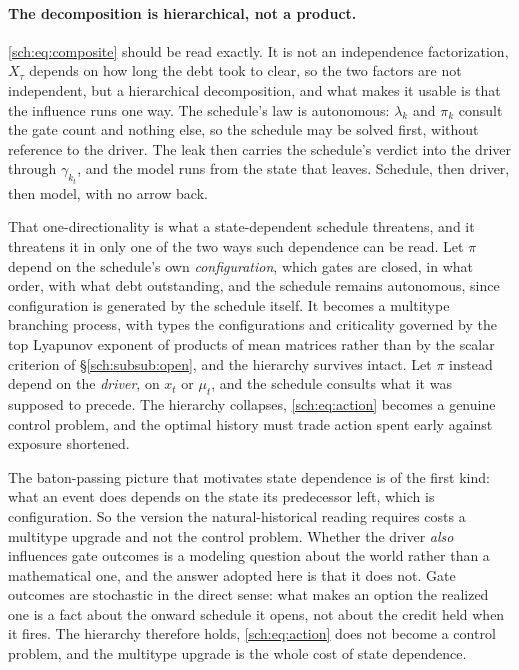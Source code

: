 \documentclass[11pt]{article}
\theoremstyle{plain}
\theoremstyle{definition}
\theoremstyle{remark}
\begin{document}
\paragraph{The decomposition is hierarchical, not a product.}\label{sch:rem:hierarchical}
\eqref{sch:eq:composite} should be read exactly. It is not an
independence factorization, $X_\tau$ depends on how long the debt
took to clear, so the two factors are not independent, but a
hierarchical decomposition, and what makes it usable is that the
influence runs one way. The schedule's law is autonomous: $\lambda_k$
and $\pi_k$ consult the gate count and nothing else, so the schedule may
be solved first, without reference to the driver. The leak then carries
the schedule's verdict into the driver through $\gamma_{k_t}$, and the
model runs from the state that leaves. Schedule, then driver, then
model, with no arrow back.

That one-directionality is what a state-dependent schedule threatens,
and it threatens it in only one of the two ways such dependence can be
read. Let $\pi$ depend on the schedule's own \emph{configuration}, which gates are closed, in what order, with what debt outstanding, and the schedule remains autonomous, since configuration is generated by
the schedule itself. It becomes a multitype branching process, with
types the configurations and criticality governed by the top Lyapunov
exponent of products of mean matrices rather than by the scalar
criterion of \S\ref{sch:subsub:open}, and the hierarchy survives intact.
Let $\pi$ instead depend on the \emph{driver}, on $x_t$ or $\mu_t$, and the schedule consults what it was supposed to precede. The
hierarchy collapses, \eqref{sch:eq:action} becomes a genuine control
problem, and the optimal history must trade action spent early against
exposure shortened.

The baton-passing picture that motivates state dependence is of the
first kind: what an event does depends on the state its predecessor
left, which is configuration. So the version the natural-historical
reading requires costs a multitype upgrade and not the control problem.
Whether the driver \emph{also} influences gate outcomes is a modeling
question about the world rather than a mathematical one, and the answer
adopted here is that it does not. Gate outcomes are stochastic in the
direct sense: what makes an option the realized one is a fact about the
onward schedule it opens, not about the credit held when it fires. The
hierarchy therefore holds, \eqref{sch:eq:action} does not become a
control problem, and the multitype upgrade is the whole cost of state
dependence.
\end{document}

